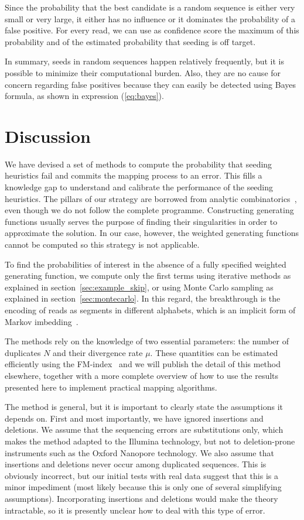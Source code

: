 \documentclass{article}
\begin{document}
Since the probability that the best candidate is a random sequence is
either very small or very large, it either has no influence or it
dominates the probability of a false positive. For every read, we can use
as confidence score the maximum of this probability and of the estimated
probability that seeding is off target.

In summary, seeds in random sequences happen relatively frequently, but it
is possible to minimize their computational burden. Also, they are no
cause for concern regarding false positives because they can easily be
detected using Bayes formula, as shown in expression (\ref{eq:bayes}).



\section{Discussion}

We have devised a set of methods to compute the probability that seeding
heuristics fail and commits the mapping process to an error. This
fills a knowledge gap to understand and calibrate the performance of the
seeding heuristics. The pillars of our strategy are borrowed from analytic
combinatorics~\cite{flajolet2009analytic, sedgewick2013introduction}, even
though we do not follow the complete programme. Constructing generating
functions usually serves the purpose of finding their singularities in
order to approximate the solution. In our case, however, the weighted
generating functions cannot be computed so this strategy is not
applicable.

To find the probabilities of interest in the absence of a fully specified
weighted generating function, we compute only the first terms using
iterative methods as explained in section~\ref{sec:example_skip}, or using
Monte Carlo sampling as explained in section~\ref{sec:montecarlo}. In this
regard, the breakthrough is the encoding of reads as segments in different
alphabets, which is an implicit form of Markov
imbedding~\cite{fu1994distribution}.

The methods rely on the knowledge of two essential parameters: the number
of duplicates $N$ and their divergence rate $\mu$. These quantities can be
estimated efficiently using the FM-index~\cite{ferragina2005indexing} and
we will publish the detail of this method elsewhere, together with a more
complete overview of how to use the results presented here to implement
practical mapping algorithms.

The method is general, but it is important to clearly state the
assumptions it depends on. First and most importantly, we have ignored
insertions and deletions. We assume that the sequencing errors are
substitutions only, which makes the method adapted to the Illumina
technology, but not to deletion-prone instruments such as the Oxford
Nanopore technology. We also assume that insertions and deletions never
occur among duplicated sequences. This is obviously incorrect, but our
initial tests with real data suggest that this is a minor impediment (most
likely because this is only one of several simplifying assumptions).
Incorporating insertions and deletions would make the theory intractable,
so it is presently unclear how to deal with this type of error.
\end{document}
